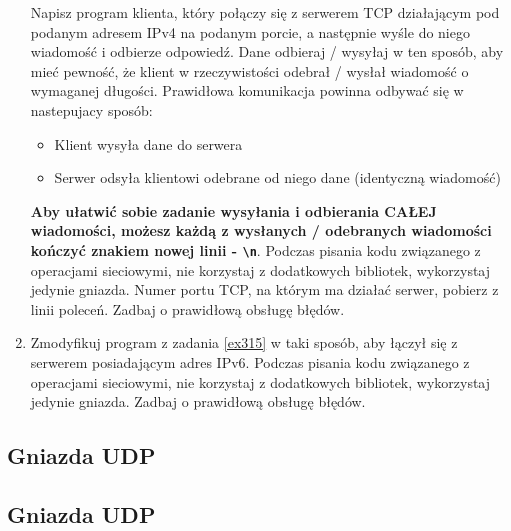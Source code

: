 \documentclass{article}
\begin{document}
\begin{enumerate}[label=\textbf{3.\arabic*}]
Napisz program klienta, który połączy się z serwerem TCP działającym pod podanym adresem IPv4 na podanym porcie, a następnie wyśle do niego wiadomość i odbierze odpowiedź. Dane odbieraj / wysyłaj w ten sposób, aby mieć pewność, że klient w rzeczywistości odebrał / wysłał wiadomość o wymaganej długości. Prawidłowa komunikacja powinna odbywać się w nastepujacy sposób:

\begin{itemize}
\item Klient wysyła dane do serwera
\item Serwer odsyła klientowi odebrane od niego dane (identyczną wiadomość) 
\end{itemize}

\noindent \textbf{Aby ułatwić sobie zadanie wysyłania i odbierania CAŁEJ wiadomości, możesz każdą z wysłanych / odebranych wiadomości kończyć znakiem nowej linii - \texttt{\textbackslash n}}. Podczas pisania kodu związanego z operacjami sieciowymi, nie korzystaj z dodatkowych bibliotek, wykorzystaj jedynie gniazda. Numer portu TCP, na którym ma działać serwer, pobierz z linii poleceń. Zadbaj o prawidłową obsługę błędów. 
    
    \item Zmodyfikuj program z zadania \ref{ex315} w taki sposób,  aby łączył się z serwerem posiadającym adres IPv6. Podczas pisania kodu związanego z operacjami sieciowymi, nie korzystaj z dodatkowych bibliotek, wykorzystaj jedynie gniazda. Zadbaj o prawidłową obsługę błędów. 
   
\end{enumerate}

\newpage

\subsection*{Gniazda UDP}


\newpage
\subsection*{Gniazda UDP}
\end{document}
